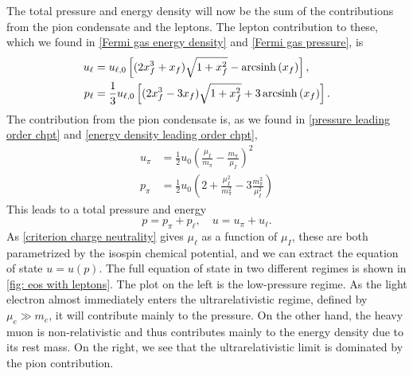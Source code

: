 The total pressure and energy density will now be the sum of the contributions from the pion condensate and the leptons.
The lepton contribution to these, which we found in \autoref{Fermi gas energy density} and \autoref{Fermi gas pressure}, is
%
\begin{align}
    u_\ell 
    &= u_{\ell,0} 
    \left[(2x_f^3 + x_f) \sqrt{1 + x_f^2} - \operatorname{arcsinh}\left(x_f\right)\right], \\
    p_\ell
    &=\frac{1}{3} u_{\ell,0}
    \left[(2x_f^3 - 3x_f) \sqrt{1 + x_f^2} + 3\operatorname{arcsinh}\left(x_f\right)\right].
\end{align}
%
The contribution from the pion condensate is, as we found in \autoref{pressure leading order chpt} and \autoref{energy density leading order chpt},
%
\begin{align}
    u_\pi &= \frac{1}{2} u_0 \left( \frac{\mu_I}{m_\pi} - \frac{m_\pi}{\mu_I}\right)^2 \\
    p_\pi &= \frac{1}{2} u_0 \left( 2 + \frac{\mu_I^2}{m_\pi^2} - 3 \frac{m_\pi^2}{\mu_I^2}  \right)
\end{align}
%
This leads to a total pressure and energy
%
\begin{equation}
    p = p_\pi + p_\ell, \quad u = u_\pi + u_\ell.
\end{equation}
%
As \autoref{criterion charge neutrality} gives $\mu_\ell$ as a function of $\mu_I$, these are both parametrized by the isospin chemical potential, and we can extract the equation of state $u = u(p)$.
The full equation of state in two different regimes is shown in \autoref{fig: eos with leptons}.
The plot on the left is the low-pressure regime.
As the light electron almost immediately enters the ultrarelativistic regime, defined by $\mu_e\gg m_e$, it will contribute mainly to the pressure.
On the other hand, the heavy muon is non-relativistic and thus contributes mainly to the energy density due to its rest mass.
On the right, we see that the ultrarelativistic limit is dominated by the pion contribution.

